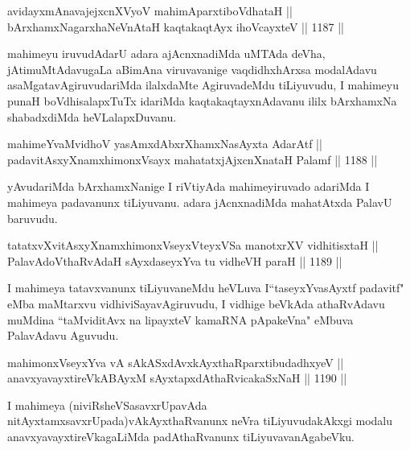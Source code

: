 \begin{shl}
avidayxmAnavajejxcnXVyoV mahimAparxtiboVdhataH || \\
bArxhamxNagarxhaNeVnAtaH kaqtakaqtAyx ihoVcayxteV \hfill || 1187 ||  
\end{shl}

\begin{artha}
mahimeyu iruvudAdarU adara ajAcnxnadiMda uMTAda deVha, jAtimuMtAdavugaLa aBimAna viruvavanige vaqdidhxhArxsa modalAdavu asaMgatavAgiruvudariMda ilalxdaMte AgiruvadeMdu tiLiyuvudu, I mahimeyu punaH boVdhisalapxTuTx idariMda kaqtakaqtayxnAdavanu ililx bArxhamxNa shabadxdiMda heVLalapxDuvanu.
\end{artha}


\begin{shl}
mahimeYvaMvidhoV yasAmxdAbxrXhamxNasAyxta AdarAtf || \\
padavitAsxyXnamxhimonxV\s sayx mahatatxjAjxcnXnataH Palamf \hfill || 1188 ||  
\end{shl}

\begin{artha}
yAvudariMda bArxhamxNanige I riVtiyAda mahimeyiruvado adariMda I mahimeya padavanunx tiLiyuvanu. adara jAcnxnadiMda mahatAtxda PalavU baruvudu.
\end{artha}


\begin{shl}
tatatxvXvitAsxyXnamxhimonxV\s seyxVteyxVSa manotxrXV vidhitisxtaH || \\
PalavAdoV\s thaRvAdaH sAyxdaseyxYva tu vidheVH paraH \hfill || 1189 ||  
\end{shl}

\begin{artha}
I mahimeya tatavxvanunx tiLiyuvaneMdu heVLuva I\break ``taseyxYvasAyxtf padavitf" eMba maMtarxvu vidhiviSayavAgiruvudu, I vidhige beVkAda athaRvAdavu muMdina ``taMviditAvx na lipayxteV kamaRNA pApakeVna" eMbuva PalavAdavu Aguvudu.
\end{artha}

\begin{shl}
mahimonxV\s seyxYva vA sAkASxdAvxkAyxthaRparxtibudadhxyeV || \\
anavxyavayxtireVkABAyxM sAyxtapxdAthaRvicakaSxNaH \hfill || 1190 ||  
\end{shl}

\begin{artha}
I mahimeya (niviRsheVSasavxrUpavAda nitAyxtamxsavxrUpada)\break vAkAyxthaRvanunx neVra tiLiyuvudakAkxgi modalu anavxyavayxtireVkagaLiMda padAthaRvanunx tiLiyuvavanAgabeVku.
\end{artha}

